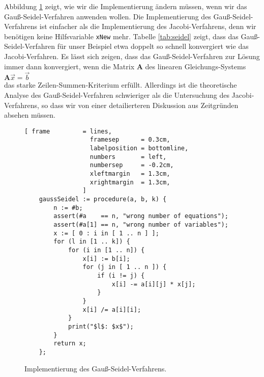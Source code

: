 Abbildung \ref{fig:seidel.stlx} zeigt, wie wir die Implementierung \"andern
m\"ussen, wenn wir das Gau{\ss}-Seidel-Verfahren anwenden wollen.  Die Implementierung des
Gau{\ss}-Seidel-Verfahrens ist einfacher als die Implementierung des Jacobi-Verfahrens, denn
wir ben\"otigen keine Hilfsvariable \texttt{xNew} mehr.
Tabelle \ref{tab:seidel} zeigt, dass das Gau{\ss}-Seidel-Verfahren f\"ur
unser Beispiel etwa doppelt so schnell konvergiert wie das Jacobi-Verfahren.
Es l\"asst sich zeigen, dass das Gau{\ss}-Seidel-Verfahren zur L\"osung immer dann konvergiert, wenn die Matrix
$\mathbf{A}$ des linearen Gleichungs-Systems
\\[0.2cm]
\hspace*{1.3cm}
$\mathbf{A} \vec{x} = \vec{b}$
\\[0.2cm]
das starke Zeilen-Summen-Kriterium erf\"ullt.  Allerdings ist die theoretische Analyse des
Gau{\ss}-Seidel-Verfahren schwieriger als die Untersuchung des Jacobi-Verfahrens, so dass wir von einer
detailierteren Diskussion aus Zeitgr\"unden absehen m\"ussen.

\begin{figure}[!ht]
  \centering
\begin{Verbatim}[ frame         = lines, 
                  framesep      = 0.3cm, 
                  labelposition = bottomline,
                  numbers       = left,
                  numbersep     = -0.2cm,
                  xleftmargin   = 1.3cm,
                  xrightmargin  = 1.3cm,
                ]
    gaussSeidel := procedure(a, b, k) {
        n := #b;
        assert(#a    == n, "wrong number of equations");
        assert(#a[1] == n, "wrong number of variables");
        x := [ 0 : i in [ 1 .. n ] ];
        for (l in [1 .. k]) {
            for (i in [1 .. n]) {
                x[i] := b[i];
                for (j in [ 1 .. n ]) {
                    if (i != j) {
                        x[i] -= a[i][j] * x[j];
                    }
                }
                x[i] /= a[i][i];
            }
            print("$l$: $x$");
        }
        return x;       
    };
    \end{Verbatim}
\vspace*{-0.3cm}
  \caption{Implementierung des Gau{\ss}-Seidel-Verfahrens.}
  \label{fig:seidel.stlx}
\end{figure} %


